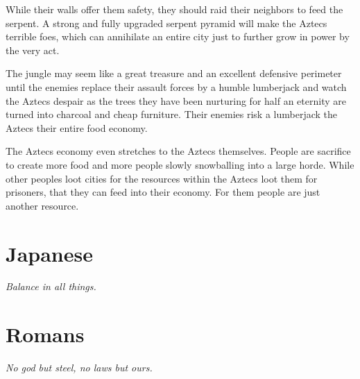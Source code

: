 \documentclass[a4paper]{book}
\begin{document}
While their walls offer them safety, they should raid their neighbors to feed
the serpent. A strong and fully upgraded serpent pyramid will make the
\gls{Aztecs} terrible foes, which can annihilate an entire city just to further
grow in power by the very act.

The jungle may seem like a great treasure and an excellent defensive perimeter
until the enemies replace their assault forces by a humble lumberjack and watch
the \gls{Aztecs} despair as the trees they have been nurturing for half an
eternity are turned into charcoal and cheap furniture. Their enemies risk a
lumberjack the \gls{Aztecs} their entire food economy.

The \gls{Aztecs} economy even stretches to the \gls{Aztecs} themselves. People
are sacrifice to create more food and more people slowly snowballing into a
large horde. While other peoples loot cities for the resources within the
\gls{Aztecs} loot them for prisoners, that they can feed into their economy.
For them people are just another resource.

\section{\Gls{Japanese}}

\begin{flushright}
	\emph{Balance in all things.}
\end{flushright}

\section{\Gls{Romans}}

\begin{flushright}
	\emph{No god but steel, no laws but ours.}
\end{flushright}
\end{document}
